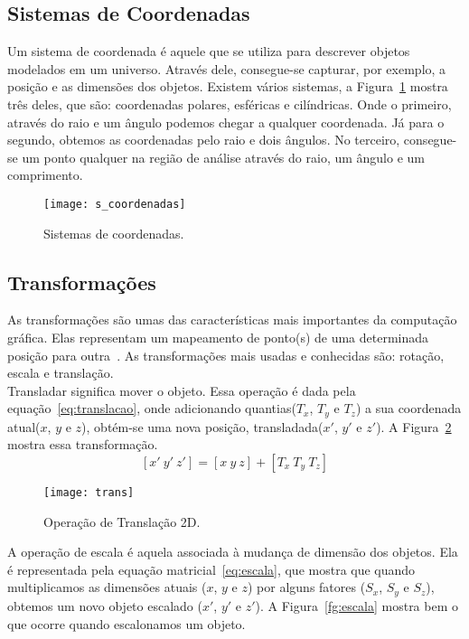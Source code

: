 \subsection{Sistemas de Coordenadas}
Um sistema de coordenada é aquele que se utiliza para descrever objetos modelados em um universo. Através dele, consegue-se capturar, por exemplo, a posição e as dimensões dos objetos. Existem vários sistemas, a Figura~\ref{fg:coordenadas} mostra três deles, que são: coordenadas polares, esféricas e cilíndricas. Onde o primeiro, através do raio e um ângulo podemos chegar a qualquer coordenada. Já para o segundo, obtemos as coordenadas pelo raio e dois ângulos. No terceiro, consegue-se um ponto qualquer na região de análise através do raio, um ângulo e um comprimento.\\ 

\begin{figure}[ht!]
	\centering
	\texttt{[image: s\_coordenadas]}
	\caption{Sistemas de coordenadas.}
	\label{fg:coordenadas}
\end{figure}

\subsection{Transformações}
As transformações são umas das características mais importantes da computação gráfica. Elas representam um mapeamento de ponto(s) de uma determinada posição para outra~\cite{comp_grafica1}. As transformações mais usadas e conhecidas são: rotação, escala e translação.\\

Transladar significa mover o objeto. Essa operação é dada pela equação~\ref{eq:translacao}, onde adicionando quantias($T_x$, $T_y$ e $T_z$) a sua coordenada atual($x$, $y$ e $z$), obtém-se uma nova posição, transladada($x'$, $y'$ e $z'$). A Figura~\ref{fg:trans} mostra essa transformação. \\

\begin{equation}\label{eq:translacao}
[x'\ y'\ z'] = [x\ y\ z] + [T_{x}\ T_{y}\ T_{z}]
\end{equation}

\begin{figure}[ht!]
      \centering
	  \texttt{[image: trans]}
	  \caption{Operação de Translação 2D.}
	  \label{fg:trans}
\end{figure} 

A operação de escala é aquela associada à mudança de dimensão dos objetos. Ela é representada pela equação matricial~\ref{eq:escala}, que mostra que quando multiplicamos as dimensões atuais ($x$, $y$ e $z$) por alguns fatores ($S_x$, $S_y$ e $S_z$), obtemos um novo objeto escalado ($x'$, $y'$ e $z'$). A Figura~\ref{fg:escala} mostra bem o que ocorre quando escalonamos um objeto.\\

